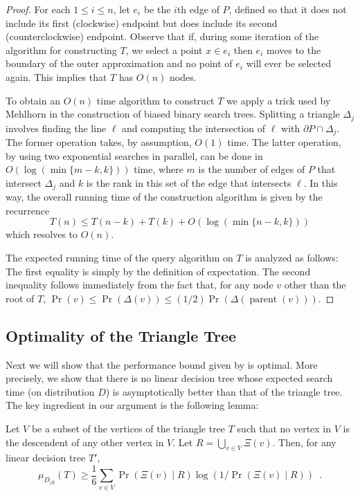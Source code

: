 \documentclass[charterfonts,lotsofwhite]{patmorin}
\newcommand{\boundary}{\partial}
\DeclareMathOperator{\prnt}{parent}
\begin{document}
\begin{proof}
For each $1\le i\le n$, let $e_i$ be the $i$th edge of $P$, defined so
that it does not include its first (clockwise) endpoint but does
include its second (counterclockwise) endpoint.  Observe that if,
during some iteration of the algorithm for constructing $T$, we select
a point $x\in e_i$ then $e_i$ moves to the boundary of the outer
approximation and no point of $e_i$ will ever be selected again.  This
implies that $T$ has $O(n)$ nodes.

To obtain an $O(n)$ time algorithm to construct $T$ we apply a trick
used by Mehlhorn \cite{m75} in the construction of biased binary
search trees.  Splitting a triangle $\Delta_j$ involves finding the
line $\ell$ and computing the intersection of $\ell$ with
$\boundary P\cap \Delta_j$.  The former operation takes, by
assumption, $O(1)$ time.  The latter operation, by using two
exponential searches in parallel, can be done in $O(\log
(\min\{m-k,k\}))$ time, where $m$ is the number of edges of $P$ that
intersect $\Delta_j$ and $k$ is the rank in this set of the edge that
intersects $\ell$.  In this way, the overall running time of the
construction algorithm is given by the recurrence
\[
    T(n) \le T(n-k) + T(k) + O(\log(\min\{n-k,k\}))
\]
which resolves to $O(n)$.

The expected running time of the query algorithm on $T$ is
analyzed as follows: The first equality is simply by the definition of
expectation.  The second inequality follows immediately from the fact
that, for any node $v$ other than the root of $T$, $\Pr(v)\le
\Pr(\Delta(v))\le (1/2)\Pr(\Delta(\prnt(v)))$.
\end{proof}


\subsection{Optimality of the Triangle Tree}

Next we will show that the performance bound given by
 is optimal.  More precisely, we show that there
is no linear decision tree whose expected search time (on distribution
$D$) is asymptotically better than that of the triangle tree.  The key
ingredient in our argument is the following lemma:

\begin{lem}
Let $V$ be a subset of the vertices of the triangle tree $T$ such that
no vertex in $V$ is the descendent of any other vertex in $V$.  
Let $R=\bigcup_{v\in V} \Xi(v)$. Then, for any linear decision
tree $T'$,
\[
    \mu_{D_{|R}}(T) 
	\ge \frac{1}{6}\sum_{v\in V}\Pr(\Xi(v)\mid
R)\log(1/\Pr(\Xi(v)\mid R)) \enspace .
\]
\end{lem}
\end{document}
